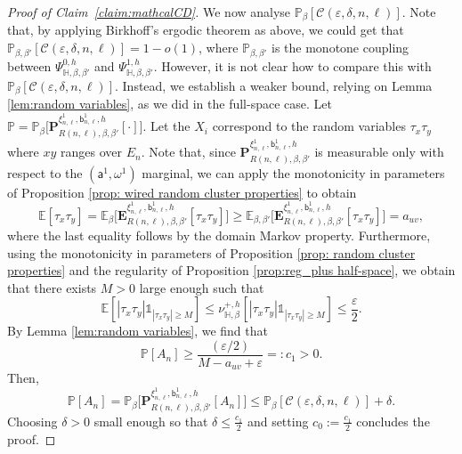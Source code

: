 \documentclass[11pt,a4paper]{article}
\numberwithin{equation}{section}
\theoremstyle{plain}
\theoremstyle{definition}
\begin{document}
\begin{proof}[Proof of Claim~\textup{\ref{claim:mathcalCD}}]
We now analyse $\mathbb P_\beta[\mathcal C(\varepsilon,\delta,n,\ell)]$. Note that, by applying Birkhoff's ergodic theorem as above, we could get that $\mathbb P_{\beta,\beta'}[\mathcal C(\varepsilon,\delta,n,\ell)]=1-o(1)$, where $\mathbb P_{\beta,\beta'}$ is the monotone coupling between $\Psi^{0,h}_{\mathbb H, \beta, \beta'}$ and $\Psi^{1,h}_{\mathbb H, \beta, \beta'}$. However, it is not clear how to compare this with $\mathbb P_\beta[\mathcal C(\varepsilon,\delta,n,\ell)]$. Instead, we establish a weaker bound, relying on Lemma \ref{lem:random variables}, as we did in the full-space case. Let $\mathbb P = \mathbb P_\beta\big[\mathbf P^{\xi^1_{n,\ell}, \mathsf b^1_{n,\ell}, h}_{R(n,\ell),\beta,\beta'}[\cdot]\big]$. Let the $X_i$ correspond to the random variables $\tau_x\tau_y$ where $xy$ ranges over $E_n$. Note that, since $\mathbf P^{\xi^1_{n,\ell}, \mathsf b^1_{n,\ell}, h}_{R(n,\ell),\beta,\beta'}$ is measurable only with respect to the $(\mathsf a^1,\omega^1)$ marginal, we can apply the monotonicity in parameters of Proposition \ref{prop: wired random cluster properties} to obtain
\begin{equation}
\mathbb E[\tau_x\tau_y]=\mathbb E_\beta\Big[\mathbf E^{\xi^1_{n,\ell}, \mathsf b^1_{n,\ell}, h}_{R(n,\ell),\beta,\beta'}[\tau_x\tau_y]\Big] \geq \mathbb E_{\beta,\beta'}\Big[\mathbf E^{\xi^1_{n,\ell}, \mathsf b^1_{n,\ell}, h}_{R(n,\ell),\beta,\beta'}[\tau_x\tau_y]\Big] = a_{uv},
\end{equation}
where the last equality follows by the domain Markov property.
Furthermore, using the monotonicity in parameters of Proposition \ref{prop: random cluster properties} and the regularity of Proposition \ref{prop:reg_plus half-space}, we obtain that there exists $M>0$ large enough such that
\begin{equation}
\mathbb E[|\tau_x\tau_y|\mathds{1}_{|\tau_x\tau_y|\geq M}]\leq \nu_{\mathbb H,\beta}^{+,h}[|\tau_x\tau_y|\mathds{1}_{|\tau_x\tau_y|\geq M}]\leq \frac{\varepsilon}{2}.
\end{equation}
By Lemma \ref{lem:random variables}, we find that
\begin{equation}
    \mathbb P[A_n]\geq \frac{(\varepsilon/2)}{M-a_{uv}+\varepsilon}=:c_1>0.
\end{equation}
Then,
\begin{equation}
    \mathbb P[A_n]=\mathbb P_\beta\Big[\mathbf P^{\xi^1_{n,\ell}, \mathsf b^1_{n,\ell}, h}_{R(n,\ell),\beta,\beta'}[A_n]\Big]\leq \mathbb P_{\beta}[\mathcal{C}(\varepsilon,\delta,n,\ell)]+\delta.
\end{equation}
Choosing $\delta>0$ small enough so that $\delta\leq \tfrac{c_1}{2}$ and setting $c_0:=\tfrac{c_1}{2}$ concludes the proof.
\end{proof}
\end{document}
